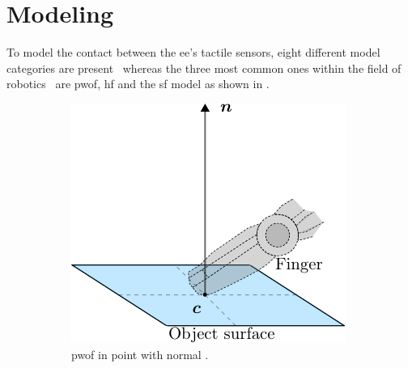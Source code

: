 
\chapter{Modeling} \label{ch:modeling}

To model the contact between the \gls{ee}'s tactile sensors, eight different model categories are present~\cite{articulated-hands-force-control-and-kinematic-issues} whereas the three most common ones within the field of robotics~\cite[Chapter 37]{handbook-of-robotics} are \gls{pwof}, \gls{hf} and the \gls{sf} model as shown in . \medskip

\begin{figure}[h]
	\centering
	\begin{subfigure}[b]{0.3\textwidth}
		\centering
		\includegraphics[width=\textwidth]{chapters/modeling/fig/contact-no-friction.pdf}
		\caption{\gls{pwof} in point  with normal . \\\hspace{\textwidth} }
		\label{fig:pwof}
	\end{subfigure}
	\hfill
	\begin{subfigure}[b]{0.3\textwidth}
		\centering

\end{subfigure}
\end{figure}

